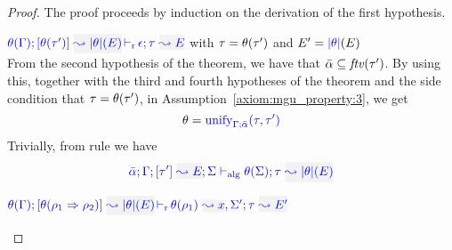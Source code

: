 \begin{proof}
The proof proceeds by induction on the derivation of the first hypothesis.
\begin{description}
\setlength{\itemsep}{1em}
\item[\fbox{\rref{M-Simp}}]\quad
$\dmres{\theta(\tenv)}{\theta(\type')}{\etrans{\theta}(E)}{\type}{E}{\epsilon}$ \quad with $\tau = \theta(\tau')$ and $E' = {\color{blue} |\theta|}(E)$ \\

From the second hypothesis of the theorem, we have that $\bar\alpha\subseteq{\it ftv }(\tau')$. By
using this, together with the third and fourth hypotheses of the theorem and the side condition
that $\tau = \theta(\tau')$, in Assumption~\ref{axiom:mgu_property:3}, we get
\begin{equation*}
  \theta = {\color{blue} \mathrm{unify}_{\Gamma;\bar{\alpha}}(\tau,\tau')}
\end{equation*}
Trivially, from rule  we have
\begin{equation*}
  \admres{\bar\alpha}{\tenv}{\type'}{E}{\Sigma}{\type}{\etrans{\theta}(E)}{\theta(\Sigma)}
\end{equation*}

\item[\fbox{\rref{M-IApp}}]\quad
$\dmres{\theta(\tenv)}{\theta(\rulet_1\To\rulet_2)}{\etrans{\theta}(E)}{\type}{E'}{\ie{\theta(\rulet_1)}{x},\Sigma'}$\ \\


\end{description}
\end{proof}
